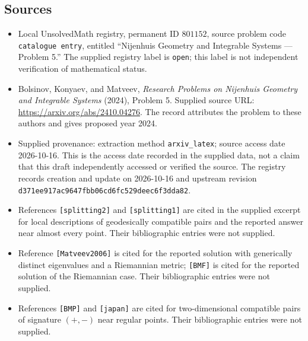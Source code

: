 \documentclass[11pt]{article}
\begin{document}
\subsection{Sources}
\begin{itemize}
\item Local UnsolvedMath registry, permanent ID \(801152\), source problem code \texttt{catalogue entry}, entitled ``Nijenhuis Geometry and Integrable Systems --- Problem 5.'' The supplied registry label is \texttt{open}; this label is not independent verification of mathematical status.
\item Bolsinov, Konyaev, and Matveev, \emph{Research Problems on Nijenhuis Geometry and Integrable Systems} (2024), Problem 5. Supplied source URL: \url{https://arxiv.org/abs/2410.04276}. The record attributes the problem to these authors and gives proposed year 2024.
\item Supplied provenance: extraction method \texttt{arxiv\_latex}; source access date 2026-10-16. This is the access date recorded in the supplied data, not a claim that this draft independently accessed or verified the source. The registry records creation and update on 2026-10-16 and upstream revision \texttt{d371ee917ac9647fbb06cd6fc529deec6f3dda82}.
\item References \texttt{[splitting2]} and \texttt{[splitting1]} are cited in the supplied excerpt for local descriptions of geodesically compatible pairs and the reported answer near almost every point. Their bibliographic entries were not supplied.
\item Reference \texttt{[Matveev2006]} is cited for the reported solution with generically distinct eigenvalues and a Riemannian metric; \texttt{[BMF]} is cited for the reported solution of the Riemannian case. Their bibliographic entries were not supplied.
\item References \texttt{[BMP]} and \texttt{[japan]} are cited for two-dimensional compatible pairs of signature \((+,-)\) near regular points. Their bibliographic entries were not supplied.
\end{itemize}
\end{document}
